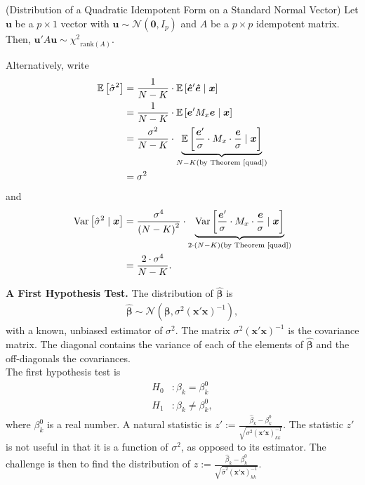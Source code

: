 \begin{theorem} \label{quad} (Distribution of a Quadratic Idempotent Form on a Standard Normal Vector) Let $\bm{u}$ be a $p \times 1$ vector with $\bm{u} \sim \mathcal{N} \left( \bm{0}, I_p \right)$ and $A$ be a $p \times p$ idempotent matrix. Then, $\bm{u}' A \bm{u} \sim {\chi^2}_{\text{rank}\left(A\right)}$.  
\end{theorem}
\noindent Alternatively, write 
\begin{align}
\mathbb{E} \left[ \hat{\sigma}^2 \right] & = \frac{1}{N-K} \cdot \mathbb{E} \left[ \bm{\hat{e}}' \bm{\hat{e}} \mid \bm{x} \right] \nonumber \\
	 & = \frac{1}{N-K} \cdot \mathbb{E} \left[ \bm{e}' M_x \bm{e} \mid \bm{x} \right] \nonumber \\
	 & = \frac{\sigma^2}{N-K} \cdot \underbrace{ \mathbb{E} \left[ \frac{\bm{e}'}{\sigma} \cdot M_x \cdot \frac{\bm{e}}{\sigma} \mid \bm{x} \right] }_{N - K (\text{by Theorem~\ref{quad}}) } \nonumber \\ 
	 & = \sigma^2 
\end{align}
\noindent and 
\begin{align}
\operatorname{Var} \left[ \hat{\sigma}^2  \mid \bm{x} \right] & = \frac{\sigma^4}{ { \left( N-K \right) }^2 } \cdot \underbrace{ \operatorname{Var} \left[ \frac{\bm{e}'}{\sigma} \cdot M_x \cdot \frac{\bm{e}}{\sigma}  \mid \bm{x} \right] }_{2 \cdot \left( N - K \right) (\text{by Theorem~\ref{quad}}) } \nonumber \\ 
	 & = \frac{ 2 \cdot \sigma^4 }{ N - K}.  
\end{align}

\noindent \textbf{A First Hypothesis Test.} The distribution of $\bm{\hat{\beta}}$ is
\begin{align}
	\bm{\hat{\beta}} \sim \mathcal{N} \left( \bm{\beta}, \sigma^2 {\left( \bm{x}' \bm{x} \right)}^{-1} \right), 
\end{align}
\noindent with a known, unbiased estimator of $\sigma^2$. The matrix $\sigma^2 {\left( \bm{x}' \bm{x} \right)}^{-1}$ is the covariance matrix. The diagonal contains the variance of each of the elements of $\bm{\hat{\beta}}$ and the off-diagonals the covariances.\\ 

\noindent The first hypothesis test is
\begin{align}
	H_0 & : \beta_k  = \beta_k^0 \nonumber \\ 
	H_1 & : \beta_k  \neq \beta_k^0 \nonumber, 
\end{align}
\noindent where $\beta_k^0$ is a real number. A natural statistic is $z':= \frac{\hat{\beta}_k - \beta_k^0} { \sqrt{ \sigma^2 { \left( \bm{x}' \bm{x}  \right) }_{kk}^{-1} } }$. The statistic $z'$ is not useful in that it is a function of $\sigma^2$, as opposed to its estimator. The challenge is then to find the distribution of $z:= \frac{\hat{\beta}_k - \beta_k^0} { \sqrt{ \hat{\sigma}^2 { \left( \bm{x}' \bm{x}  \right) }_{kk}^{-1} } }$.

